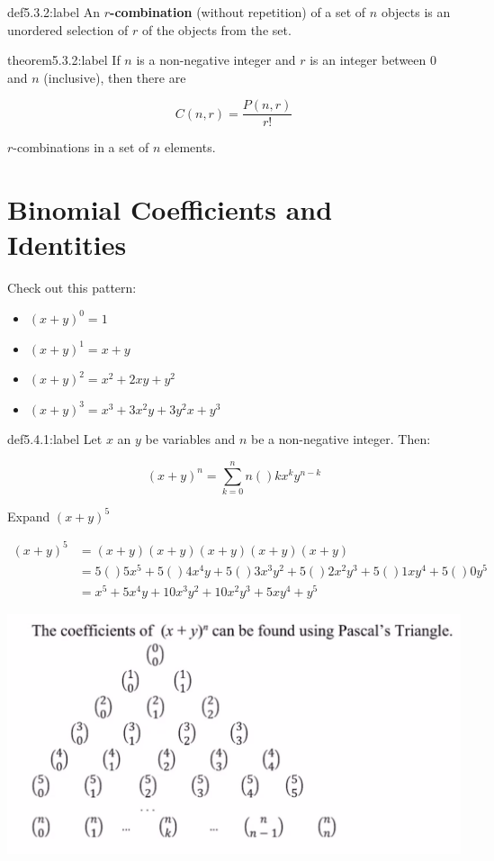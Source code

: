\begin{definition}{def5.3.2:label}
    An \textbf{$r$-combination} (without repetition) of a set of $n$ objects is an unordered selection of $r$ of the objects from the set.
\end{definition}


\begin{theorem}{theorem5.3.2:label}
    If $n$ is a non-negative integer and $r$ is an integer between 0 and $n$ (inclusive), then there are 
    
    $$
    C(n,r) = \frac{P(n,r)}{r!}
    $$

    $r$-combinations in a set of $n$ elements.
\end{theorem}


\section{Binomial Coefficients and Identities}

Check out this pattern:

\begin{itemize}
    \item $(x+y)^0 = 1$
    \item $(x+y)^1 = x+y$
    \item $(x+y)^2=x^2+2xy+y^2$
    \item $(x+y)^3=x^3+3x^2y+3y^2x+y^3$
\end{itemize}

\begin{definition}{def5.4.1:label}
    Let $x$ an $y$ be variables and $n$ be a non-negative integer. Then:

    $$
    (x+y)^n = \sum_{k=0}^n n()kx^ky^{n-k}
    $$
\end{definition}

\begin{problem}
    Expand $(x+y)^5$

    $$
    \begin{aligned}
        (x+y)^5 &= (x+y)(x+y)(x+y)(x+y)(x+y)\\
        &= 5()5x^5+5()4x^4y+5()3x^3y^2+5()2x^2y^3+5()1xy^4+5()0y^5\\
        &= x^5+5x^4y+10x^3y^2+10x^2y^3+5xy^4+y^5
    \end{aligned}
    $$
\end{problem}

\begin{center}
    \includegraphics[width=1\textwidth]{chapters/ch5/images/fig5.4.1.PNG}
\end{center}